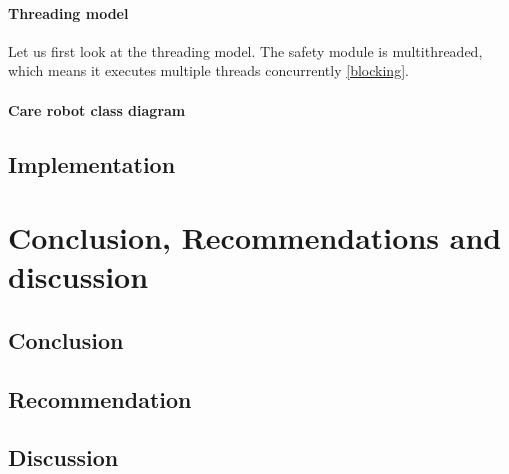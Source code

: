 \documentclass[12pt]{scrreprt}
\begin{document}
\subsubsection{Threading model}
Let us first look at the threading model. The safety module is multithreaded, which means it executes multiple threads concurrently \ref{blocking}.
\subsubsection{Care robot class diagram}
\label{Other models of the system}

\section{Implementation}

\chapter{Conclusion, Recommendations and discussion}
\section{Conclusion}
\section{Recommendation}



\section{Discussion}
\end{document}
